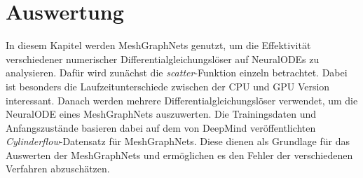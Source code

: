 
\chapter{Auswertung} \label{ch:auswertung}

In diesem Kapitel werden MeshGraphNets genutzt, um die Effektivität verschiedener numerischer
Differentialgleichungslöser auf NeuralODEs zu analysieren.
Dafür wird zunächst die \textit{scatter}-Funktion einzeln betrachtet.
Dabei ist besonders die Laufzeitunterschiede zwischen der CPU und GPU Version 
interessant.
Danach werden mehrere Differentialgleichungslöser verwendet, um die NeuralODE 
eines MeshGraphNets auszuwerten.
Die Trainingsdaten und Anfangszustände basieren dabei auf dem von DeepMind 
veröffentlichten \textit{Cylinderflow}-Datensatz für MeshGraphNets\cite{meshgraphnets}.
Diese dienen als Grundlage für das Auswerten der MeshGraphNets und ermöglichen es
den Fehler der verschiedenen Verfahren abzuschätzen.






% 






